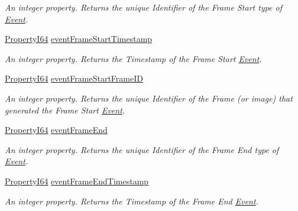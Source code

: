 \begin{DoxyCompactItemize}
\begin{DoxyCompactList}\small\item\em An integer property. Returns the unique Identifier of the Frame Start type of \hyperlink{classmv_i_m_p_a_c_t_1_1acquire_1_1_event}{Event}. \end{DoxyCompactList}\item 
\hyperlink{group___common_interface_ga81749b2696755513663492664a18a893}{Property\+I64} \hyperlink{classmv_i_m_p_a_c_t_1_1acquire_1_1_gen_i_cam_1_1_event_control_a58d33b27102e36e3c281c5429ff3d546}{event\+Frame\+Start\+Timestamp}
\begin{DoxyCompactList}\small\item\em An integer property. Returns the Timestamp of the Frame Start \hyperlink{classmv_i_m_p_a_c_t_1_1acquire_1_1_event}{Event}. \end{DoxyCompactList}\item 
\hyperlink{group___common_interface_ga81749b2696755513663492664a18a893}{Property\+I64} \hyperlink{classmv_i_m_p_a_c_t_1_1acquire_1_1_gen_i_cam_1_1_event_control_a4dd05b796d40c131763fcfc689d28315}{event\+Frame\+Start\+Frame\+I\+D}
\begin{DoxyCompactList}\small\item\em An integer property. Returns the unique Identifier of the Frame (or image) that generated the Frame Start \hyperlink{classmv_i_m_p_a_c_t_1_1acquire_1_1_event}{Event}. \end{DoxyCompactList}\item 
\hyperlink{group___common_interface_ga81749b2696755513663492664a18a893}{Property\+I64} \hyperlink{classmv_i_m_p_a_c_t_1_1acquire_1_1_gen_i_cam_1_1_event_control_a2ff9ab9e23707c5da27429850cd808a8}{event\+Frame\+End}
\begin{DoxyCompactList}\small\item\em An integer property. Returns the unique Identifier of the Frame End type of \hyperlink{classmv_i_m_p_a_c_t_1_1acquire_1_1_event}{Event}. \end{DoxyCompactList}\item 
\hyperlink{group___common_interface_ga81749b2696755513663492664a18a893}{Property\+I64} \hyperlink{classmv_i_m_p_a_c_t_1_1acquire_1_1_gen_i_cam_1_1_event_control_aa416f99690b9cf4f4cc07fc5682eb76f}{event\+Frame\+End\+Timestamp}
\begin{DoxyCompactList}\small\item\em An integer property. Returns the Timestamp of the Frame End \hyperlink{classmv_i_m_p_a_c_t_1_1acquire_1_1_event}{Event}. \end{DoxyCompactList}\item 

\end{DoxyCompactItemize}
